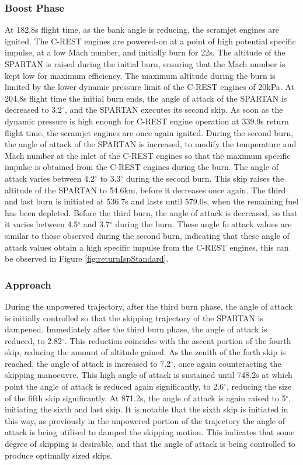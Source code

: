 \subsubsection{ Boost Phase}
At 182.8s flight time, as the bank angle is reducing, the scramjet engines are ignited. The C-REST engines are powered-on at a point of high potential specific impulse, at a low Mach number, and initially burn for 22s. The altitude of the SPARTAN is raised during the initial burn, ensuring that the Mach number is kept low for maximum efficiency. The maximum altitude during the burn is limited by the lower dynamic pressure limit of the C-REST engines of 20kPa. 
At 204.8s flight time the initial burn ends, the angle of attack of the SPARTAN is decreased to 3.2$^\circ$, and the SPARTAN executes its second skip. As soon as the dynamic pressure is high enough for C-REST engine operation at 339.9s return flight time, the scramjet engines are once again ignited.
During the second burn, the angle of attack of the SPARTAN is increased, to modify the temperature and Mach number at the inlet of the C-REST engines so that the maximum specific impulse is obtained from the C-REST engines during the burn. 
The angle of attack varies between 4.2$^\circ$ to 3.3$^\circ$ during the second burn. 
This skip raises the altitude of the SPARTAN to 54.6km, before it decreases once again. 
The third and last burn is initiated at 536.7s and lasts until 579.0s, when the remaining fuel has been depleted. Before the third burn, the angle of attack is decreased, so that it varies between 4.5$^\circ$ and 3.7$^\circ$ during the burn. These angle fo attack values are similar to those observed during the second burn, indicating that these angle of attack values obtain a high specific impulse from the C-REST engines, this can be observed in Figure \ref{fig:returnIspStandard}. 


\subsubsection{ Approach}

During the unpowered trajectory, after the third burn phase, the angle of attack is initially controlled so that the skipping trajectory of the SPARTAN is dampened.
Immediately after the third burn phase, the angle of attack is reduced, to 2.82$^\circ$. This reduction coincides with the ascent portion of the fourth skip, reducing the amount of altitude gained. 
As the zenith of the forth skip is reached, the angle of attack is increased to 7.2$^\circ$, once again counteracting the skipping manoeuvre. 
This high angle of attack is sustained until 748.2s at which point the angle of attack is reduced again significantly, to 2.6$^\circ$, reducing the size of the fifth skip significantly. At 871.2s, the angle of attack is again raised to 5$^\circ$, initiating the sixth and last skip.
It is notable that the sixth skip is initiated in this way, as previously in the unpowered portion of the trajectory the angle of attack is being utilised to damped the skipping motion. This indicates that some degree of skipping is desirable, and that the angle of attack is being controlled to produce optimally sized skips. 

